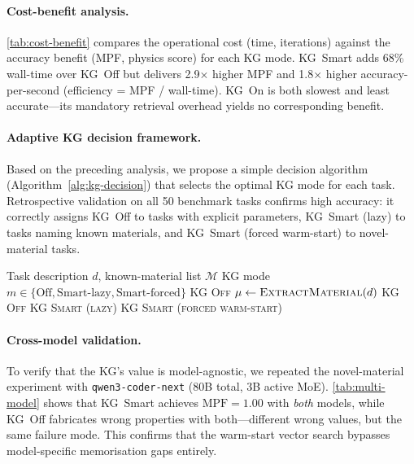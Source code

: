 \documentclass[twocolumn]{article}
\begin{document}
\paragraph{Cost-benefit analysis.}
\cref{tab:cost-benefit} compares the operational cost (time, iterations)
against the accuracy benefit (MPF, physics score) for each KG mode.
KG~Smart adds 68\% wall-time over KG~Off but delivers 2.9$\times$
higher MPF and 1.8$\times$ higher accuracy-per-second (efficiency =
MPF / wall-time).  KG~On is both slowest and least accurate---its
mandatory retrieval overhead yields no corresponding benefit.



\paragraph{Adaptive KG decision framework.}
Based on the preceding analysis, we propose a simple decision algorithm
(Algorithm~\ref{alg:kg-decision}) that selects the optimal KG mode for
each task.  Retrospective validation on all 50 benchmark tasks
confirms high accuracy: it correctly assigns KG~Off to tasks with
explicit parameters, KG~Smart (lazy) to tasks naming known materials,
and KG~Smart (forced warm-start) to novel-material tasks.

\begin{algorithm}[t]
\caption{Adaptive KG Mode Selection}
\label{alg:kg-decision}
\begin{algorithmic}[1]
\Require Task description $d$, known-material list $\mathcal{M}$
\Ensure KG mode $m \in \{\text{Off}, \text{Smart-lazy}, \text{Smart-forced}\}$
  \State \Return \textsc{KG Off}
\EndIf
\State $\mu \gets \textsc{ExtractMaterial}(d)$
\If{$\mu = \varnothing$}
  \State \Return \textsc{KG Off}
  \State \Return \textsc{KG Smart (lazy)}
\Else
  \State \Return \textsc{KG Smart (forced warm-start)}
\EndIf
\end{algorithmic}
\end{algorithm}

\paragraph{Cross-model validation.}
To verify that the KG's value is model-agnostic, we repeated the
novel-material experiment with \texttt{qwen3-coder-next} (80B total,
3B active MoE).  \cref{tab:multi-model} shows that KG~Smart achieves
$\text{MPF}{=}1.00$ with \emph{both} models, while KG~Off fabricates
wrong properties with both---different wrong values, but the same
failure mode.  This confirms that the warm-start vector search
bypasses model-specific memorisation gaps entirely.
\end{document}
